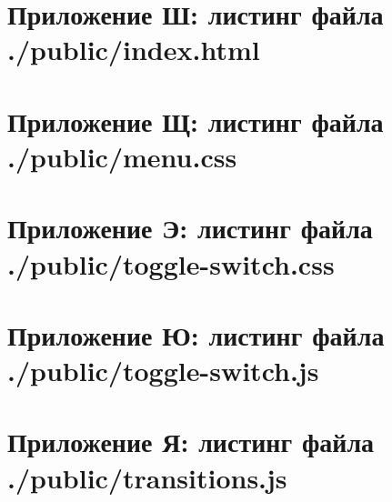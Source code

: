 \documentclass{article}
\begin{document}
    \section{Приложение Ш: листинг файла ./public/index.html}
    

    \section{Приложение Щ: листинг файла ./public/menu.css}
    

    \section{Приложение Э: листинг файла ./public/toggle-switch.css}
    

    \section{Приложение Ю: листинг файла ./public/toggle-switch.js}
    

    \section{Приложение Я: листинг файла ./public/transitions.js}
    

    
\end{document}
